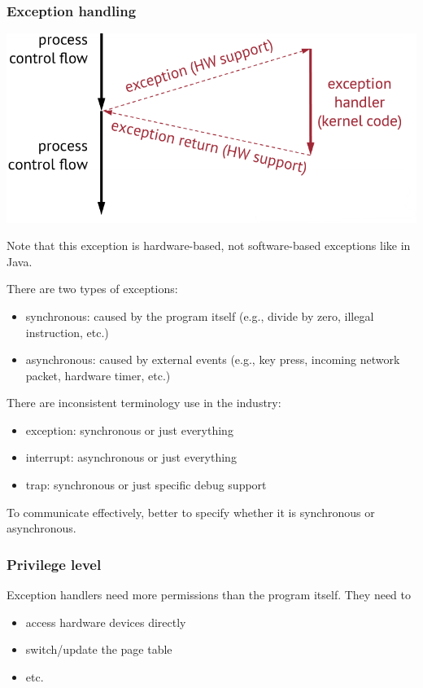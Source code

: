 \documentclass[letterpaper,12pt]{article}
\begin{document}
\subsubsection{Exception handling}
\includegraphics*[scale=0.8]{./Images/Exception Handeling.png}

Note that this exception is hardware-based, not software-based exceptions like in Java.

There are two types of exceptions:
\begin{itemize}
    \item synchronous: caused by the program itself (e.g., divide by zero, illegal instruction, etc.)
    \item asynchronous: caused by external events (e.g., key press, incoming network packet, hardware timer, etc.)
\end{itemize}
There are inconsistent terminology use in the industry:\begin{itemize}
    \item exception: synchronous or just everything
    \item interrupt: asynchronous or just everything
    \item trap: synchronous or just specific debug support
\end{itemize}
To communicate effectively, better to specify whether it is synchronous or asynchronous.
\subsubsection{Privilege level}
Exception handlers need more permissions than the program itself. They need to \begin{itemize}
    \item access hardware devices directly
    \item switch/update the page table
    \item etc.
\end{itemize}
\end{document}
